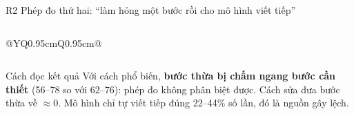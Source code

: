 \documentclass[aspectratio=169,t]{beamer}
\begin{document}
\begin{frame}[shrink]{R2 \textperiodcentered{} Phép đo thứ hai: ``làm hỏng một bước rồi cho mô hình viết tiếp''}
\begin{columns}[T,onlytextwidth]
\begin{tabularx}{\linewidth}{@{}YQ{0.95cm}Q{0.95cm}@{}}
\bottomrule
\end{tabularx}
\end{columns}
\par\vspace{3pt}
\begin{exampleblock}{Cách đọc kết quả}
\footnotesize Với cách phổ biến, \textbf{bước thừa bị chấm ngang bước cần thiết} (56--78 so với 62--76): phép đo không phân biệt được. Cách sửa đưa bước thừa về $\approx 0$. Mô hình chỉ tự viết tiếp đúng 22--44\% số lần, đó là nguồn gây lệch.
\end{exampleblock}
\par\kern0pt
\end{frame}
\end{document}
